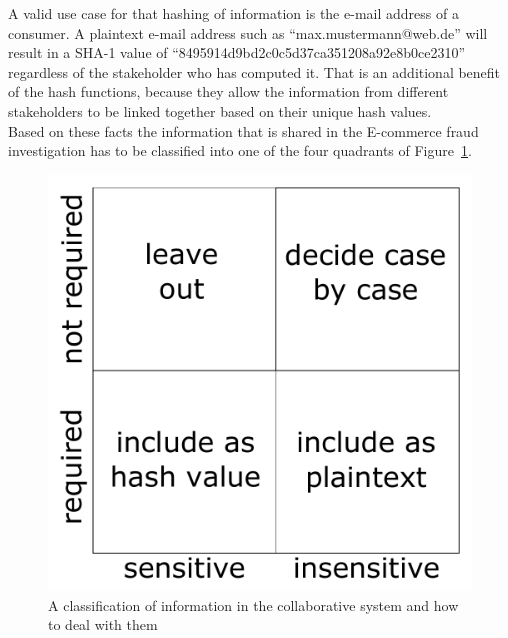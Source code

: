 A valid use case for that hashing of information is the e-mail address of a consumer. A plaintext e-mail address such as ``max.mustermann@web.de'' will result in a SHA-1 value of ``8495914d9bd2c0c5d37ca351208a92e8b0ce2310'' regardless of the stakeholder who has computed it. That is an additional benefit of the hash functions, because they allow the information from different stakeholders to be linked together based on their unique hash values. \\

Based on these facts the information that is shared in the \gls{E-commerce} fraud investigation has to be classified into one of the four quadrants of Figure~\ref{fig:images_handle_privacy_concerns}. \@

\begin{figure}[H]
	\centering
		\includegraphics[width=0.5\columnwidth]{images/privacy_concerns.pdf}
	\caption{A classification of information in the collaborative system and how to deal with them}
\label{fig:images_handle_privacy_concerns}
\end{figure}


